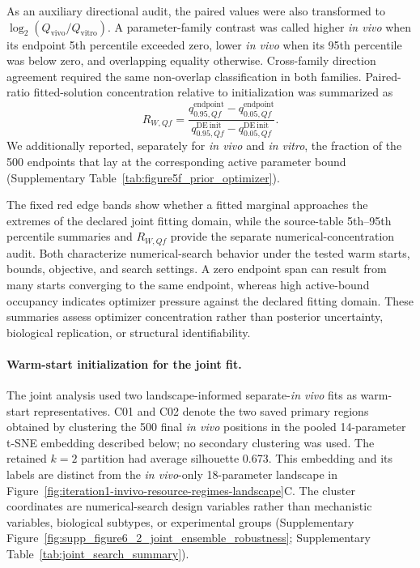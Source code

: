 \documentclass[11pt]{article}
\begin{document}
As an auxiliary directional audit, the paired values were also transformed to \(\log_2(Q_{\mathrm{vivo}}/Q_{\mathrm{vitro}})\). A parameter-family contrast was called higher \textit{in vivo} when its endpoint 5th percentile exceeded zero, lower \textit{in vivo} when its 95th percentile was below zero, and overlapping equality otherwise. Cross-family direction agreement required the same non-overlap classification in both families. Paired-ratio fitted-solution concentration relative to initialization was summarized as
\begin{equation}
R_{W,Qf}
=
\frac{q_{0.95,Qf}^{\mathrm{endpoint}}-q_{0.05,Qf}^{\mathrm{endpoint}}}
{q_{0.95,Qf}^{\mathrm{DE\ init}}-q_{0.05,Qf}^{\mathrm{DE\ init}}}.
\label{eq:appendix_figure5f_width_ratio}
\end{equation}
We additionally reported, separately for \textit{in vivo} and \textit{in vitro}, the fraction of the 500 endpoints that lay at the corresponding active parameter bound (Supplementary Table~\ref{tab:figure5f_prior_optimizer}).

The fixed red edge bands show whether a fitted marginal approaches the extremes of the declared joint fitting domain, while the source-table 5th--95th percentile summaries and $R_{W,Qf}$ provide the separate numerical-concentration audit. Both characterize numerical-search behavior under the tested warm starts, bounds, objective, and search settings. A zero endpoint span can result from many starts converging to the same endpoint, whereas high active-bound occupancy indicates optimizer pressure against the declared fitting domain. These summaries assess optimizer concentration rather than posterior uncertainty, biological replication, or structural identifiability.


\paragraph{Warm-start initialization for the joint fit.}

The joint analysis used two landscape-informed separate-\textit{in vivo} fits as warm-start representatives. C01 and C02 denote the two saved primary regions obtained by clustering the 500 final \textit{in vivo} positions in the pooled 14-parameter t-SNE embedding described below; no secondary clustering was used. The retained $k=2$ partition had average silhouette 0.673. This embedding and its labels are distinct from the \textit{in vivo}-only 18-parameter landscape in Figure~\ref{fig:iteration1-invivo-resource-regimes-landscape}C. The cluster coordinates are numerical-search design variables rather than mechanistic variables, biological subtypes, or experimental groups (Supplementary Figure~\ref{fig:supp_figure6_2_joint_ensemble_robustness}; Supplementary Table~\ref{tab:joint_search_summary}).
\end{document}
